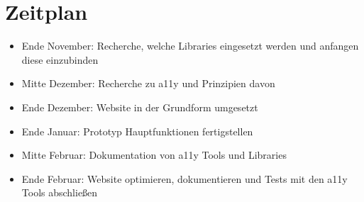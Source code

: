 \chapter{Zeitplan}
\label{Timetable}

\begin{itemize}
    \item Ende November: Recherche, welche Libraries eingesetzt werden und anfangen diese einzubinden
    \item Mitte Dezember: Recherche zu a11y und Prinzipien davon
    \item Ende Dezember: Website in der Grundform umgesetzt
    \item Ende Januar: Prototyp Hauptfunktionen fertigstellen
    \item Mitte Februar: Dokumentation von a11y Tools und Libraries
    \item Ende Februar: Website optimieren, dokumentieren und Tests mit den a11y Tools abschließen
\end{itemize}